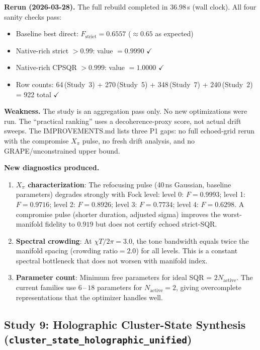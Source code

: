 \documentclass[11pt,letterpaper]{article}
\newcommand{\chiT}{\chi T / 2\pi}
\newcommand{\nact}{N_{\text{active}}}
\newcommand{\passmark}{\textcolor{pass}{$\checkmark$}}
\begin{document}
\textbf{Rerun (2026-03-28).}  The full rebuild completed in 36.98\,s (wall clock).
All four sanity checks pass:
\begin{itemize}
\item Baseline best direct: $F_\text{strict} = 0.6557$ ($\approx 0.65$ as expected)
\item Native-rich strict $> 0.99$: value $= 0.9990$ \passmark
\item Native-rich CPSQR $> 0.999$: value $= 1.0000$ \passmark
\item Row counts: 64\,(Study~3) + 270\,(Study~5) + 348\,(Study~7) + 240\,(Study~2) = 922 total \passmark
\end{itemize}

\textbf{Weakness.}  The study is an aggregation pass only.  No new optimizations were
run.  The ``practical ranking'' uses a decoherence-proxy score, not actual drift sweeps.
The IMPROVEMENTS.md lists three P1 gaps: no full echoed-grid rerun with the
compromise $X_\pi$ pulse, no fresh drift analysis, and no GRAPE/unconstrained
upper bound.

\textbf{New diagnostics produced.}
\begin{enumerate}
\item \textbf{$X_\pi$ characterization}: The refocusing pulse (40\,ns Gaussian,
  baseline parameters) degrades strongly with Fock level:
  level 0: $F = 0.9993$; level 1: $F = 0.9716$; level 2: $F = 0.8926$;
  level 3: $F = 0.7734$; level 4: $F = 0.6298$.
  A compromise pulse (shorter duration, adjusted sigma) improves the
  worst-manifold fidelity to $0.919$ but does not certify echoed strict-SQR.
\item \textbf{Spectral crowding}: At $\chiT = 3.0$, the tone bandwidth equals
  twice the manifold spacing ($\text{crowding ratio} = 2.0$) for all levels.
  This is a constant spectral bottleneck that does not worsen with manifold index.
\item \textbf{Parameter count}: Minimum free parameters for ideal SQR = $2\nact$.
  The current families use $6\,\text{--}\,18$ parameters for $\nact = 2$,
  giving overcomplete representations that the optimizer handles well.
\end{enumerate}

\subsection{Study 9: Holographic Cluster-State Synthesis (\texttt{cluster\_state\_holographic\_unified})}
\end{document}
